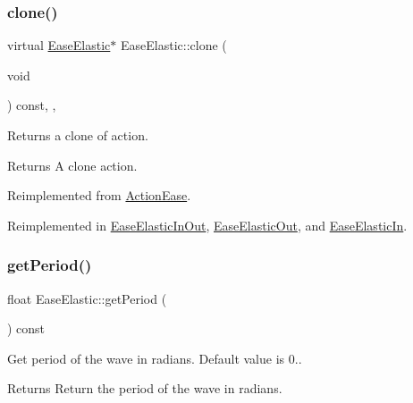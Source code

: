 \subsubsection{\texorpdfstring{clone()}{clone()}}
{\footnotesize\ttfamily virtual \hyperlink{classEaseElastic}{Ease\+Elastic}$\ast$ Ease\+Elastic\+::clone (\begin{DoxyParamCaption}\item[{void}]{ }\end{DoxyParamCaption}) const\hspace{0.3cm}{\ttfamily [inline]}, {\ttfamily [override]}, {\ttfamily [virtual]}}

Returns a clone of action.

\begin{DoxyReturn}{Returns}
A clone action. 
\end{DoxyReturn}


Reimplemented from \hyperlink{classActionEase_a39bec93fe161fb732a74d8e51a2fe08b}{Action\+Ease}.



Reimplemented in \hyperlink{classEaseElasticInOut_a3b008e59719729110c7965170788c0b4}{Ease\+Elastic\+In\+Out}, \hyperlink{classEaseElasticOut_a1f1e56422100f620e725ec11c595e1f2}{Ease\+Elastic\+Out}, and \hyperlink{classEaseElasticIn_af0095a2934fe5ba057205638349c132f}{Ease\+Elastic\+In}.

\mbox{\label{classEaseElastic_aa9ca56d793366495e88753f7b1ac4f6d}} 
\subsubsection{\texorpdfstring{get\+Period()}{getPeriod()}\hspace{0.1cm}{\footnotesize\ttfamily [1/2]}}
{\footnotesize\ttfamily float Ease\+Elastic\+::get\+Period (\begin{DoxyParamCaption}{ }\end{DoxyParamCaption}) const\hspace{0.3cm}{\ttfamily [inline]}}



Get period of the wave in radians. Default value is 0.. 

\begin{DoxyReturn}{Returns}
Return the period of the wave in radians. 
\end{DoxyReturn}
\mbox{\label{classEaseElastic_aa9ca56d793366495e88753f7b1ac4f6d}} 
